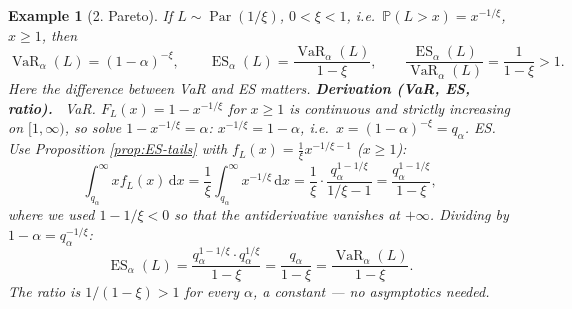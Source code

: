 \documentclass[11pt,a4paper]{article}
\newtheorem{example}{Example}
\newcommand{\VaR}{\operatorname{VaR}}
\newcommand{\ES}{\operatorname{ES}}
\newcommand{\Par}{\operatorname{Par}}
\renewcommand{\P}{\mathbb{P}}
\newcommand{\dd}{\,\mathrm{d}}
\newcommand{\der}[1]{\medskip\noindent\textbf{Derivation (#1).}\ }
\begin{document}
\begin{example}[2. Pareto]\label{ex:pareto}
If $L\sim\Par(1/\xi)$, $0<\xi<1$, i.e.\ $\P(L>x)=x^{-1/\xi}$, $x\ge1$, then
\[
  \VaR_\alpha(L)=(1-\alpha)^{-\xi},\qquad
  \ES_\alpha(L)=\frac{\VaR_\alpha(L)}{1-\xi},\qquad
  \frac{\ES_\alpha(L)}{\VaR_\alpha(L)}=\frac{1}{1-\xi}>1 .
\]
Here the difference between VaR and ES matters.
\der{VaR, ES, ratio}
\emph{VaR.} $F_L(x)=1-x^{-1/\xi}$ for $x\ge1$ is continuous and strictly increasing on $[1,\infty)$, so
solve $1-x^{-1/\xi}=\alpha$: $x^{-1/\xi}=1-\alpha$, i.e.\
$x=(1-\alpha)^{-\xi}=q_\alpha$.
\emph{ES.} Use Proposition \ref{prop:ES-tails} with $f_L(x)=\frac1\xi x^{-1/\xi-1}$ ($x\ge1$):
\[
  \int_{q_\alpha}^{\infty}x f_L(x)\dd x
  =\frac1\xi\int_{q_\alpha}^{\infty}x^{-1/\xi}\dd x
  =\frac1\xi\cdot\frac{q_\alpha^{1-1/\xi}}{1/\xi-1}
  =\frac{q_\alpha^{1-1/\xi}}{1-\xi},
\]
where we used $1-1/\xi<0$ so that the antiderivative vanishes at $+\infty$. Dividing by
$1-\alpha=q_\alpha^{-1/\xi}$:
\[
  \ES_\alpha(L)=\frac{q_\alpha^{1-1/\xi}\cdot q_\alpha^{1/\xi}}{1-\xi}
               =\frac{q_\alpha}{1-\xi}=\frac{\VaR_\alpha(L)}{1-\xi}.
\]
The ratio is $1/(1-\xi)>1$ for every $\alpha$, a constant --- no asymptotics needed.
\end{example}
\end{document}
